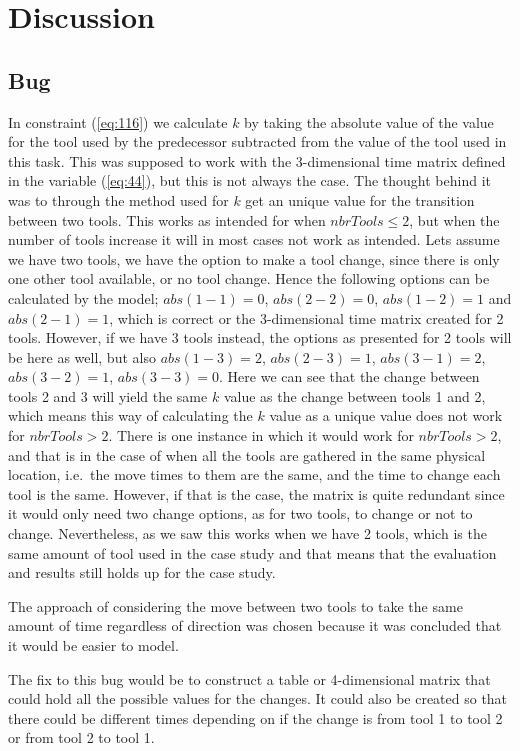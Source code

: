 \chapter{Discussion}\label{cha:discuss}

\section{Bug}\label{sec:discuss_bug}
In constraint (\ref{eq:116}) we calculate $k$ by taking the absolute value of the value for the tool used by the predecessor subtracted from the value of the tool used in this task. This was supposed to work with the 3-dimensional time matrix defined in the variable (\ref{eq:44}), but this is not always the case. The thought behind it was to through the method used for $k$ get an unique value for the transition between two tools. This works as intended for when $nbrTools \leq 2$, but when the number of tools increase it will in most cases not work as intended. Lets assume we have two tools, we have the option to make a tool change, since there is only one other tool available, or no tool change. Hence the following options can be calculated by the model; $abs(1-1)=0$, $abs(2-2)=0$, $abs(1-2)=1$ and $abs(2-1)=1$, which is correct or the 3-dimensional time matrix created for 2 tools. However, if we have 3 tools instead, the options as presented for 2 tools will be here as well, but also $abs(1-3)=2$, $abs(2-3)=1$, $abs(3-1)=2$, $abs(3-2)=1$, $abs(3-3)=0$. Here we can see that the change between tools 2 and 3 will yield the same $k$ value as the change between tools 1 and 2, which means this way of calculating the $k$ value as a unique value does not work for $nbrTools > 2$. There is one instance in which it would work for $nbrTools > 2$, and that is in the case of when all the tools are gathered in the same physical location, i.e.\ the move times to them are the same, and the time to change each tool is the same. However, if that is the case, the matrix is quite redundant since it would only need two change options, as for two tools, to change or not to change. Nevertheless, as we saw this works when we have 2 tools, which is the same amount of tool used in the case study and that means that the evaluation and results still holds up for the case study.

The approach of considering the move between two tools to take the same amount of time regardless of direction was chosen because it was concluded that it would be easier to model.

The fix to this bug would be to construct a table or 4-dimensional matrix that could hold all the possible values for the changes. It could also be created so that there could be different times depending on if the change is from tool 1 to tool 2 or from tool 2 to tool 1.

